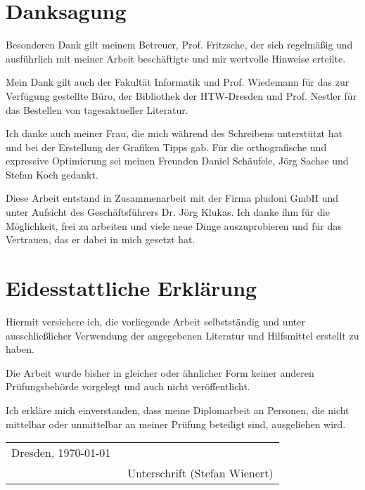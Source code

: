 \tableofcontents		%
\newpage
\chapter*{Danksagung}

Besonderen Dank gilt meinem Betreuer, Prof. Fritzsche, der sich regelmäßig und ausführlich mit meiner Arbeit beschäftigte und mir wertvolle Hinweise erteilte.

Mein Dank gilt auch der Fakultät Informatik und Prof. Wiedemann für das zur Verfügung gestellte Büro, der Bibliothek der HTW-Dresden und Prof. Nestler für das Bestellen von tagesaktueller Literatur.

Ich danke auch meiner Frau, die mich während des Schreibens unterstützt hat und bei der Erstellung der Grafiken Tipps gab. Für die orthografische und expressive Optimierung sei meinen Freunden Daniel Schäufele, Jörg Sachse und Stefan Koch gedankt.

Diese Arbeit entstand in Zusammenarbeit mit der Firma pludoni GmbH und unter Aufsicht des Geschäftsführers Dr. Jörg Klukas. Ich danke ihm für die Möglichkeit, frei zu arbeiten und viele neue Dinge auszuprobieren und für das Vertrauen, das er dabei in mich gesetzt hat.

\newpage
\chapter*{Eidesstattliche Erklärung}
	Hiermit versichere ich, die vorliegende Arbeit selbstständig und unter ausschließlicher Verwendung
	der angegebenen Literatur und Hilfsmittel erstellt zu haben.

	Die Arbeit wurde bisher in gleicher oder ähnlicher Form keiner anderen Prüfungsbehörde vorgelegt
	und auch nicht veröffentlicht.\bigskip

Ich erkläre mich einverstanden, dass meine Diplomarbeit an Personen, die nicht mittelbar oder unmittelbar an meiner Prüfung beteiligt sind, ausgeliehen wird.\bigskip

\begin{tabular}{ll}

	Dresden, \today & \underline{\qquad \qquad \qquad \qquad \qquad \qquad}\\
	& \small{\ Unterschrift (Stefan Wienert)}
\end{tabular}


